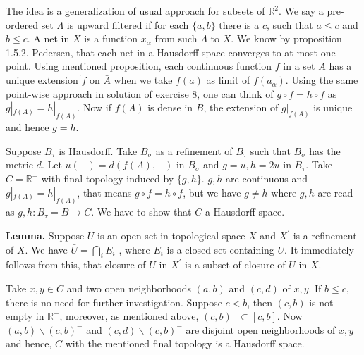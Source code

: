 
The idea is a generalization of usual approach for subsets of $\mathbb{R}^2$. We say a pre-ordered set $\Lambda$ is upward filtered if for each $\{a,b\}$ there is a $c$, such that $a \leq c$ and $b\leq c$. A net in $X$ is a function $x_{\alpha}$ from such $\Lambda$ to $X$. We know by proposition 1.5.2. Pedersen, that each net in a Hausdorff space converges to at most one point. Using mentioned proposition, each continuous function $f$ in a set $A$ has a unique extension $\tilde{f}$ on $\bar{A}$ when we take $f(a)$ as limit of $f(a_{\alpha})$. Using the same point-wise approach in solution of exercise 8, one can think of $g \circ f = h \circ f$ as $g|_{f(A)}=h|_{f(A)}$. Now if $f(A)$ is dense in $B$, the extension of $g|_{f(A)}$ is unique and hence $g=h$.


Suppose $B_{\tau}$ is Hausdorff. Take $B_{\sigma}$ as a refinement of $B_{\tau}$ such that $ B_{\sigma}$ has the metric $d$. Let $ u(-)=d(f(A), -) $ in $ B_{\sigma} $ and $ g = u, h = 2 u $ in $ B_{\tau}$. Take $C =\mathbb R^{+}$ with final topology induced by $\{g,h\}$. $g,h$ are continuous and $g|_{f(A)}=h|_{f(A)}$, that means $g \circ f = h \circ f$, but we have $ g \neq h$ where $g,h$ are read as $g,h: B_{\tau} = B \to C$. We have to show that $C$ a Hausdorff space. 

\textbf{Lemma.} Suppose $U$ is an open set in topological space $X$ and $X^{\prime}$ is a refinement of $X$. We have $\bar {U} = \bigcap_{i} E_{i}$ , where $E_{i}$ is a closed set containing $U$. It immediately follows from this, that closure of $U$ in $X^{\prime}$ is a subset of closure of $U$ in $X$.

Take $x,y \in C$ and two open neighborhoods $(a,b)$ and $(c,d)$ of $x,y$. If $b \leq c$, there is no need for further investigation. Suppose $c < b$, then $(c,b)$ is not empty in $\mathbb R ^+$, moreover, as mentioned above, $(c,b)^{-} \subset [c,b]$. Now $(a,b) \backslash (c,b)^{-}$ and $(c,d) \backslash (c,b)^{-}$ are disjoint open neighborhoods of $x,y$ and hence, $C$ with the mentioned final topology is a Hausdorff space.


